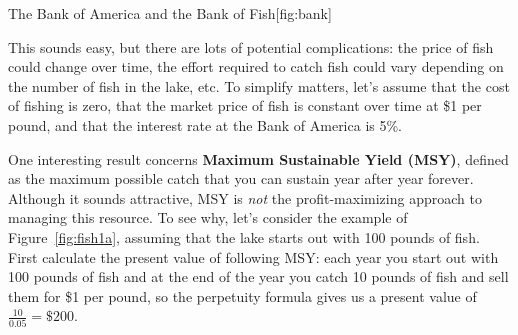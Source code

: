 \vspace*{.5cm}

\begin{Figure}[H]{The Bank of America and the Bank of Fish}[fig:bank]
\hspace{.4cm}
\end{Figure}

This sounds easy, but there are lots of potential complications: the price of fish could change over time, the effort required to catch fish could vary depending on the number of fish in the lake, etc. To simplify matters, let's assume that the cost of fishing is zero, that the market price of fish is constant over time at \$1 per pound, and that the interest rate at the Bank of America is 5\%.

One interesting result concerns \textbf{Maximum Sustainable Yield (MSY)}, defined as the maximum possible catch that you can sustain year after year forever. Although it sounds attractive, MSY is \emph{not} the profit-maximizing approach to managing this resource. To see why, let's consider the example of Figure~\ref{fig:fish1a}, assuming that the lake starts out with 100 pounds of fish. First calculate the present value of following MSY: each year you start out with 100 pounds of fish and at the end of the year you catch 10 pounds of fish and sell them for \$1 per pound, so the perpetuity formula gives us a present value of $\displaystyle \frac{10}{0.05}=\$200$.


